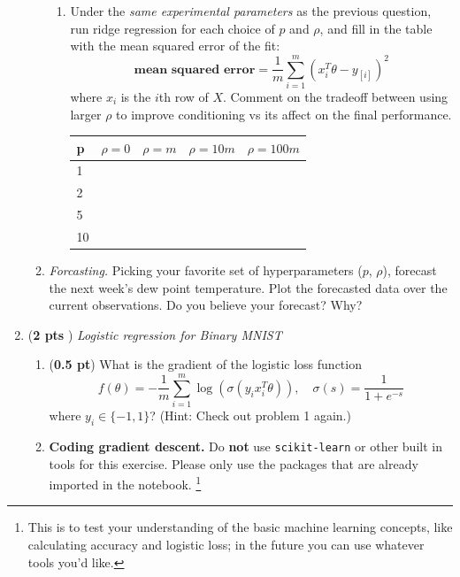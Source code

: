 \documentclass{article}
\newcommand{\idx}[1]{_{[#1]}}
\newcommand{\showpoints}[1]{(\textbf{#1})}
\begin{document}
\begin{enumerate}
\begin{enumerate}
\begin{enumerate}
\item Under the \emph{same experimental parameters} as the previous question, run ridge regression for each choice of $p$ and $\rho$, and fill in the table with the mean squared error of the fit:
\[
\textbf{mean squared error} = \frac{1}{m}\sum_{i=1}^m (x_i^T\theta - y\idx{i})^2
\]
where $x_i$ is the $i$th row of $X$.
Comment on the tradeoff between using larger $\rho$ to improve conditioning vs its affect on the final performance. 


\begin{center}
\begin{tabular}{|l||l|l|l|l|}\hline
p& $\rho = 0$   & $\rho = m$   &$\rho = 10m$   &$\rho = 100m$\\ 
\hline\hline
1&  &&&\\
\hline
2&  &&&\\\hline
5&  &&&\\\hline
10& &&&\\\hline
\end{tabular}
\end{center}




\end{enumerate}
\item \emph{Forcasting.} Picking your favorite set of hyperparameters ($p$, $\rho$), forecast the next week's dew point temperature. Plot the forecasted data over the current observations. Do you believe your forecast? Why?








\end{enumerate}



\item \showpoints{2 pts } \emph{Logistic regression for Binary MNIST} 
\begin{enumerate}
\item \showpoints{0.5 pt}
What is the gradient of the logistic loss function 
\[
f(\theta) = -\frac{1}{m}\sum_{i=1}^m \log(\sigma(y_ix_i^T\theta)), \quad \sigma(s) = \frac{1}{1+e^{-s}}
\]
where $y_i \in \{-1,1\}$? (Hint: Check out problem 1 again.)






\item \textbf{Coding gradient descent.} Do \textbf{not} use  \texttt{scikit-learn} or other built in tools for this exercise. Please only use the packages that are already imported in the notebook. \footnote{This is to test your understanding of the basic machine learning concepts, like calculating accuracy and logistic loss; in the future you can use whatever tools you'd like.}


\end{enumerate}
\end{enumerate}
\end{document}
